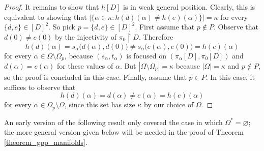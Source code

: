 \documentclass{amsart}
\theoremstyle{plain}
\theoremstyle{definition}
\begin{document}
\begin{proof}
It remains to show that $h[D]$ is in weak general position. Clearly, this is equivalent to showing that $|\{\alpha\in\kappa:h(d)(\alpha)\neq h(e)(\alpha)\}|=\kappa$ for every $\{d,e\}\in [D]^2$. So pick $p=\{d,e\}\in [D]^2$. First assume that $p\notin P$. Observe that $d(0)\neq e(0)$ by the injectivity of $\pi_0\upharpoonright D$. Therefore
$$
h(d)(\alpha)=s_\alpha\big(d(\alpha),d(0)\big)\neq s_\alpha\big(e(\alpha),e(0)\big)=h(e)(\alpha)
$$
for every $\alpha\in\Omega\setminus\Omega_p$, because $(s_\alpha,t_\alpha)$ is focused on $(\pi_\alpha[D],\pi_0[D])$ and $d(\alpha)=e(\alpha)$ for these values of $\alpha$. But $|\Omega\setminus\Omega_p|=\kappa$ because $|\Omega|=\kappa$ and $p\notin P$, so the proof is concluded in this case. Finally, assume that $p\in P$. In this case, it suffices to observe that
$$
h(d)(\alpha)=d(\alpha)\neq e(\alpha)=h(e)(\alpha)
$$
for every $\alpha\in\Omega_p\setminus\Omega$, since this set has size $\kappa$ by our choice of $\Omega$.
\end{proof}

An early version of the following result only covered the case in which $\Omega^\ast=\varnothing$; the more general version given below will be needed in the proof of Theorem \ref{theorem_gpp_manifolds}.
\end{document}
